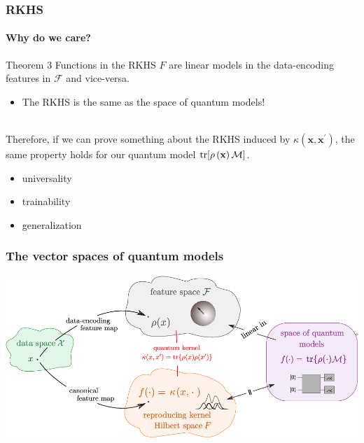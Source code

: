 \documentclass[aspectratio=43]{beamer}
\begin{document}
\begin{frame}
  \frametitle{RKHS}
  \framesubtitle{Why do we care?}

  \pause
  \begin{block}{Theorem 3}
    Functions in the RKHS $F$ are linear models in the data-encoding features in $\mathcal{F}$ and vice-versa.

    \begin{itemize}
      \item The RKHS is the same as the space of quantum models!
    \end{itemize}
  \end{block}

  \ \\
  \pause
  Therefore, if we can prove something about the RKHS induced by $\kappa\left( \mathbf{x}, \mathbf{x}^\prime\right)$, the same property holds for our quantum model $\tr[\rho\left( \mathbf{x} \right)\mathcal{M}]$.
  \begin{itemize}
    \item universality
    \item trainability
    \item generalization
  \end{itemize}

\end{frame}


\begin{frame}
  \frametitle{The vector spaces of quantum models}

  \centering
  \includegraphics[width=\textwidth]{pics/schuld-overview.png}

\end{frame}
\end{document}
